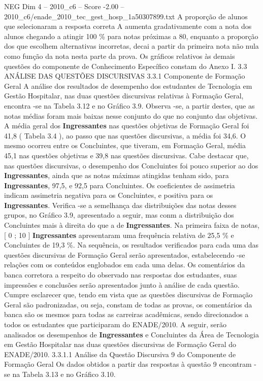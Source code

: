 \begin{textsample}{NEG Dim 4 – 2010\_c6 – Score -2.00 – 2010\_c6/enade\_2010\_tec\_gest\_hosp\_1a50307899.txt}
A proporção de alunos que selecionaram a resposta correta A aumenta gradativamente com a nota dos alunos chegando a atingir 100 \% para notas próximas a 80, enquanto a proporção dos que escolhem alternativas incorretas, decai a partir da primeira nota não nula como função da nota nesta parte da prova.
Os gráficos relativos às demais questões do componente de Conhecimento Específico constam do Anexo I. 3.3 ANÁLISE DAS QUESTÕES DISCURSIVAS 3.3.1 Componente de Formação Geral A análise dos resultados de desempenho dos estudantes de Tecnologia em Gestão Hospitalar, nas duas questões discursivas relativas à Formação Geral, encontra -se na Tabela 3.12 e no Gráfico 3.9.
Observa -se, a partir destes, que as notas médias foram mais baixas nesse conjunto do que no conjunto das objetivas.
A média geral dos \textbf{Ingressantes} nas questões objetivas de Formação Geral foi 41,8 ( Tabela 3.4 ), ao passo que nas questões discursivas, a média foi 34,6.
O mesmo ocorreu entre os Concluintes, que tiveram, em Formação Geral, média 45,1 nas questões objetivas e 39,8 nas questões discursivas.
Cabe destacar que, nas questões discursivas, o desempenho dos Concluintes foi pouco superior ao dos \textbf{Ingressantes}, ainda que as notas máximas atingidas tenham sido, para \textbf{Ingressantes}, 97,5, e 92,5 para Concluintes.
Os coeficientes de assimetria indicam assimetria negativa para os Concluintes, e positiva para os \textbf{Ingressantes}.
Verifica -se a semelhança das distribuições das notas desses grupos, no Gráfico 3.9, apresentado a seguir, mas conm a distribuição dos Concluintes mais à direita do que a de \textbf{Ingressantes}.
Na primeira faixa de notas, [ 0 ; 10 ] \textbf{Ingressantes} apresentaram uma frequência relativa de 25,5 \% e Concluintes de 19,3 \%.
Na sequência, os resultados verificados para cada uma das questões discursivas de Formação Geral serão apresentados, estabelecendo -se relações com os conteúdos englobados em cada uma delas.
Os comentários da banca corretora a respeito do observado nas respostas dos estudantes, suas impressões e conclusões serão apresentados junto à análise de cada questão.
Cumpre esclarecer que, tendo em vista que as questões discursivas de Formação Geral são padronizadas, ou seja, constam de todas as provas, os comentários da banca são os mesmos para todas as carreiras acadêmicas, sendo direcionados a todos os estudantes que participaram do ENADE/2010.
A seguir, serão analisados os desempenhos de \textbf{Ingressantes} e Concluintes da Área de Tecnologia em Gestão Hospitalar nas duas questões discursivas de Formação Geral do ENADE/2010. 3.3.1.1 Análise da Questão Discursiva 9 do Componente de Formação Geral Os dados obtidos a partir das respostas à questão 9 encontram -se na Tabela 3.13 e no Gráfico 3.10.

\end{textsample}
